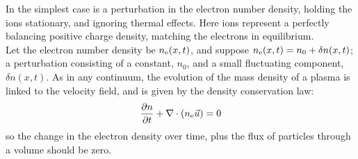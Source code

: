 \documentclass{book}         		                %
\begin{document}
In the simplest case is a perturbation in the electron number density,
holding the ions stationary, and ignoring thermal effects.  Here ions
represent a perfectly balancing positive charge density, matching the
electrons in equilibrium. \\
Let the electron number density be $n_{\rm e}(x,t)$, and suppose
$n_{\rm e}(x,t) = n_0 + \delta n(x,t)$; a perturbation consisting of a
constant, $n_0$, and a small fluctuating component, $\delta
n(x,t)$. As in any continuum, the evolution of the mass density of a
plasma is linked to the velocity field, and is given by the density
conservation law:
\begin{equation}
    \label{eq:density-conservation}
    \frac{\partial n}{\partial t} + \nabla \cdot (n_{\rm e} \vec u) = 0
\end{equation}
so the change in the electron density over time, plus the flux of
particles through a volume should be zero.

\end{document}

